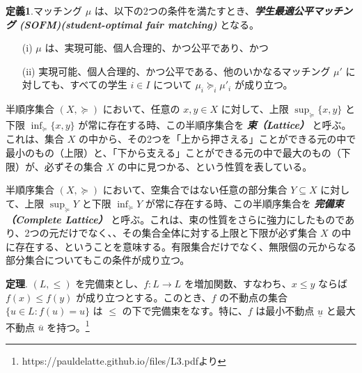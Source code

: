 \documentclass[12pt, a4paper]{article}
\theoremstyle{definition}
\theoremstyle{remark}
\theoremstyle{plain}
\begin{document}

\textbf{定義1}.マッチング $\mu$ は、以下の2つの条件を満たすとき、\textbf{\textit{学生最適公平マッチング (SOFM)(student-optimal fair matching) }} となる。
\begin{itemize}
    \item[(i)] $\mu$ は、実現可能、個人合理的、かつ公平であり、かつ
    \item[(ii)] 実現可能、個人合理的、かつ公平である、他のいかなるマッチング $\mu'$ に対しても、すべての学生 $i \in I$ について $\mu_i \succeq_i \mu'_i$ が成り立つ。
\end{itemize}





半順序集合 $(X, \succeq)$ において、任意の $x, y \in X$ に対して、上限 $\sup_{\succeq} \{x, y\}$ と下限 $\inf_{\succeq} \{x, y\}$ が常に存在する時、この半順序集合を \textbf{\textit{束（Lattice）}} と呼ぶ。これは、集合 $X$ の中から、その2つを「上から押さえる」ことができる元の中で最小のもの（上限）と、「下から支える」ことができる元の中で最大のもの（下限）が、必ずその集合 $X$ の中に見つかる、という性質を表している。


半順序集合 $(X, \succeq)$ において、空集合ではない任意の部分集合 $Y \subseteq X$ に対して、上限 $\sup_{\succeq} Y$ と下限 $\inf_{\succeq} Y$ が常に存在する時、この半順序集合を \textbf{\textit{完備束（Complete Lattice）}} と呼ぶ。これは、束の性質をさらに強力にしたものであり、2つの元だけでなく、、その集合全体に対する上限と下限が必ず集合 $X$ の中に存在する、ということを意味する。有限集合だけでなく、無限個の元からなる部分集合についてもこの条件が成り立つ。


\textbf{定理}. $(L, \leq)$ を完備束とし、$f: L \to L$ を増加関数、すなわち、$x \leq y$ ならば $f(x) \leq f(y)$ が成り立つとする。このとき、$f$ の不動点の集合 $\{ u \in L : f(u) = u \}$ は $\leq$ の下で完備束をなす。特に、$f$ は最小不動点 $\underline{u}$ と最大不動点 $\overline{u}$ を持つ。\footnote{https://pauldelatte.github.io/files/L3.pdfより}

\bigbreak
\end{document}
